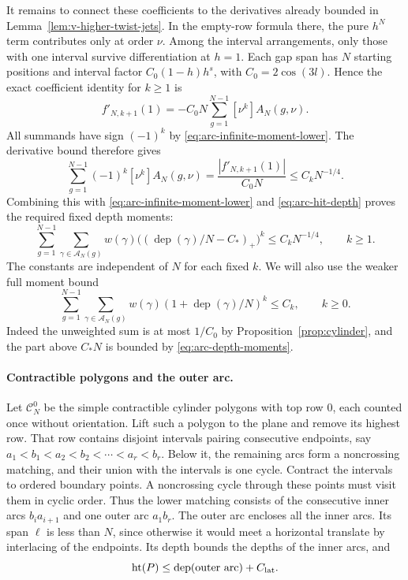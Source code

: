 It remains to connect these coefficients to the derivatives already
bounded in Lemma~\ref{lem:v-higher-twist-jets}. In the empty-row formula
there, the pure $h^N$ term contributes only at order $\nu$. Among the
interval arrangements, only those with one interval survive
differentiation at $h=1$.
Each gap span has $N$ starting positions and interval factor
$C_0(1-h)h^s$, with $C_0=2\cos(3l)$. Hence the exact coefficient identity
for $k\ge1$ is
\[
 f'_{N,k+1}(1)=-C_0N\sum_{g=1}^{N-1}[\nu^k]A_N(g,\nu).
\]
All summands have sign $(-1)^k$ by
\eqref{eq:arc-infinite-moment-lower}. The derivative bound therefore gives
\[
 \sum_{g=1}^{N-1}(-1)^k[\nu^k]A_N(g,\nu)
    =\frac{|f'_{N,k+1}(1)|}{C_0N}\le C_kN^{-1/4}.
\]
Combining this with \eqref{eq:arc-infinite-moment-lower} and
\eqref{eq:arc-hit-depth} proves the required fixed depth moments:
\begin{equation}\label{eq:arc-depth-moments}
 \sum_{g=1}^{N-1}\sum_{\gamma\in\mathscr A_N(g)}w(\gamma)
       \bigl((\operatorname{dep}(\gamma)/N-C_*)_+\bigr)^k
       \le C_kN^{-1/4},\qquad k\ge1.
\end{equation}
The constants are independent of $N$ for each fixed $k$. We will also use
the weaker full moment bound
\begin{equation}\label{eq:arc-full-moments}
 \sum_{g=1}^{N-1}\sum_{\gamma\in\mathscr A_N(g)}w(\gamma)
              (1+\operatorname{dep}(\gamma)/N)^k\le C_k,
 \qquad k\ge0.
\end{equation}
Indeed the unweighted sum is at most $1/C_0$ by
Proposition~\ref{prop:cylinder}, and the part above $C_*N$ is bounded by
\eqref{eq:arc-depth-moments}.

\paragraph{Contractible polygons and the outer arc.}
Let $\mathscr C_N^0$ be the simple contractible cylinder polygons with
top row $0$, each counted once without orientation. Lift such a polygon
to the plane and remove its highest row. That row contains disjoint
intervals pairing consecutive endpoints, say
$a_1<b_1<a_2<b_2<\cdots<a_r<b_r$. Below it, the remaining arcs form a
noncrossing matching, and their union with the intervals is one cycle.
Contract the intervals to ordered boundary points. A noncrossing cycle
through these points must visit them in cyclic order. Thus the lower
matching consists of the consecutive inner arcs $b_i a_{i+1}$ and one
outer arc $a_1b_r$. The outer arc encloses all the inner arcs. Its span
$\ell$ is less than $N$, since otherwise it would meet a horizontal
translate by interlacing of the endpoints. Its depth bounds the depths
of the inner arcs, and
\[
 \operatorname{ht}(P)\le\operatorname{dep}(\text{outer arc})+C_{\rm lat}.
\]

